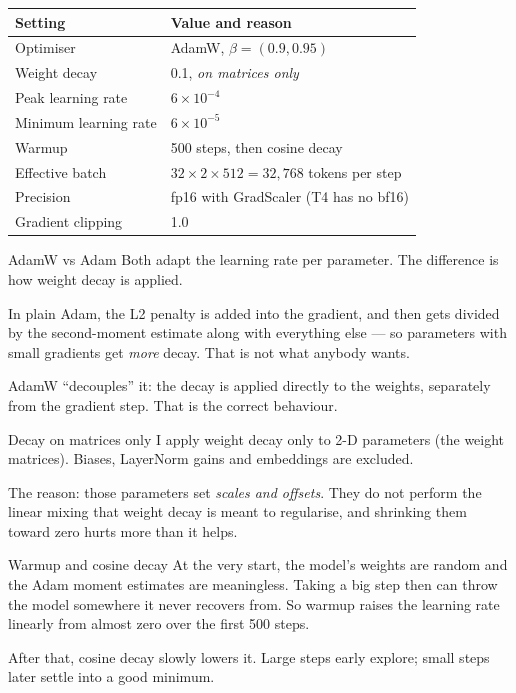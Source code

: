 \documentclass[11pt]{report}
\begin{document}
\begin{center}
\begin{tabular}{@{}ll@{}}
\toprule
\textbf{Setting} & \textbf{Value and reason} \\
\midrule
Optimiser & AdamW, $\beta = (0.9, 0.95)$ \\
Weight decay & 0.1, \emph{on matrices only} \\
Peak learning rate & $6 \times 10^{-4}$ \\
Minimum learning rate & $6 \times 10^{-5}$ \\
Warmup & 500 steps, then cosine decay \\
Effective batch & $32 \times 2 \times 512 = 32{,}768$ tokens per step \\
Precision & fp16 with GradScaler (T4 has no bf16) \\
Gradient clipping & 1.0 \\
\bottomrule
\end{tabular}
\end{center}

\begin{concept}{AdamW vs Adam}
Both adapt the learning rate per parameter. The difference is how weight decay
is applied.

In plain Adam, the L2 penalty is added into the gradient, and then gets divided
by the second-moment estimate along with everything else --- so parameters with
small gradients get \emph{more} decay. That is not what anybody wants.

AdamW ``decouples'' it: the decay is applied directly to the weights, separately
from the gradient step. That is the correct behaviour.
\end{concept}

\begin{implementation}{Decay on matrices only}
I apply weight decay only to 2-D parameters (the weight matrices). Biases,
LayerNorm gains and embeddings are excluded.

The reason: those parameters set \emph{scales and offsets}. They do not perform
the linear mixing that weight decay is meant to regularise, and shrinking them
toward zero hurts more than it helps.
\end{implementation}

\begin{concept}{Warmup and cosine decay}
At the very start, the model's weights are random and the Adam moment estimates
are meaningless. Taking a big step then can throw the model somewhere it never
recovers from. So warmup raises the learning rate linearly from almost zero over
the first 500 steps.

After that, cosine decay slowly lowers it. Large steps early explore; small
steps later settle into a good minimum.
\end{concept}
\end{document}
